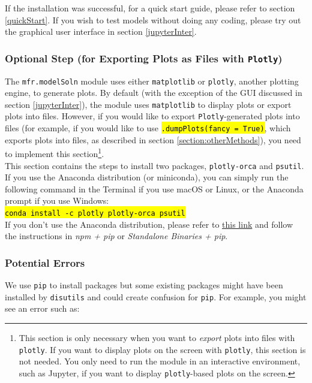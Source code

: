 \documentclass[12pt]{article}
\newcommand{\modelSolnProg}{mfr.modelSoln\xspace}
\DeclareRobustCommand{\hlCODE}[1]{{\sethlcolor{backcolour}\hl{#1}}}
\begin{document}
If the installation was successful,  for a quick start guide, please refer to section \ref{quickStart}. If you wish to test models without doing any coding, please try out the graphical user interface in section \ref{jupyterInter}.

\subsubsection{Optional Step (for Exporting Plots as Files with \texttt{Plotly})}\label{sec:optionalPlotting}
The \texttt{\modelSolnProg} module uses either \texttt{matplotlib} or \texttt{plotly}, another plotting engine, to generate plots. By default (with the exception of the GUI discussed in section \ref{jupyterInter}), the module uses \texttt{matplotlib} to display plots or export plots into files. However, if you would like to export \texttt{Plotly}-generated plots into files (for example, if you would like to use \hlCODE{\texttt{.dumpPlots(fancy = True)}}, which exports plots into files, as described in section \ref{section:otherMethods}), you need to implement this section\footnote{This section is only necessary when you want to \textit{export} plots into files with \texttt{plotly}. If you want to display plots on the screen with \texttt{plotly}, this section is not needed. You only need to run the module in an interactive environment, such as Jupyter, if you want to display \texttt{plotly}-based plots on the screen.}. \\

This section contains the steps to install two packages, \texttt{plotly-orca} and \texttt{psutil}. If you use the Anaconda distribution (or miniconda), you can simply run the following command in the Terminal if you use macOS or Linux, or the Anaconda prompt if you use Windows:\\

\hlCODE{\texttt{conda install -c plotly plotly-orca psutil}}\\

If you don't use the Anaconda distribution, please refer to \href{https://plot.ly/python/static-image-export/}{this link} and follow the instructions in \textit{npm + pip} or \textit{Standalone Binaries + pip}.
\subsubsection{Potential Errors}\label{sec:potentialError}
We use \texttt{pip} to install packages but some existing packages might have been installed by \texttt{disutils} and could create confusion for \texttt{pip}. For example, you might see an error such as:\\
\end{document}

